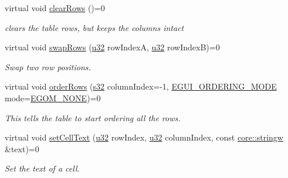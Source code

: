 \begin{DoxyCompactItemize}
virtual void \hyperlink{classirr_1_1gui_1_1IGUITable_a492adc813893d062f66c35dafa653fad}{clear\+Rows} ()=0
\begin{DoxyCompactList}\small\item\em clears the table rows, but keeps the columns intact \end{DoxyCompactList}\item 
\mbox{\label{classirr_1_1gui_1_1IGUITable_a9b54731c433912b00b3393c98a53ca68}} 
virtual void \hyperlink{classirr_1_1gui_1_1IGUITable_a9b54731c433912b00b3393c98a53ca68}{swap\+Rows} (\hyperlink{namespaceirr_a0416a53257075833e7002efd0a18e804}{u32} row\+IndexA, \hyperlink{namespaceirr_a0416a53257075833e7002efd0a18e804}{u32} row\+IndexB)=0
\begin{DoxyCompactList}\small\item\em Swap two row positions. \end{DoxyCompactList}\item 
virtual void \hyperlink{classirr_1_1gui_1_1IGUITable_a22ec8c1ee8e6a191b8bdcd741b0144f2}{order\+Rows} (\hyperlink{namespaceirr_ac66849b7a6ed16e30ebede579f9b47c6}{s32} column\+Index=-\/1, \hyperlink{namespaceirr_1_1gui_a577bf3aa30c2e3bde9aa3eaa2e4f16d3}{E\+G\+U\+I\+\_\+\+O\+R\+D\+E\+R\+I\+N\+G\+\_\+\+M\+O\+DE} mode=\hyperlink{namespaceirr_1_1gui_a577bf3aa30c2e3bde9aa3eaa2e4f16d3a4663b40ac164a811834112141af86961}{E\+G\+O\+M\+\_\+\+N\+O\+NE})=0
\begin{DoxyCompactList}\small\item\em This tells the table to start ordering all the rows. \end{DoxyCompactList}\item 
\mbox{\label{classirr_1_1gui_1_1IGUITable_a4e2445949ad689a3afca73d693d01e9c}} 
virtual void \hyperlink{classirr_1_1gui_1_1IGUITable_a4e2445949ad689a3afca73d693d01e9c}{set\+Cell\+Text} (\hyperlink{namespaceirr_a0416a53257075833e7002efd0a18e804}{u32} row\+Index, \hyperlink{namespaceirr_a0416a53257075833e7002efd0a18e804}{u32} column\+Index, const \hyperlink{namespaceirr_1_1core_aef83fafbb1b36fcce44c07c9be23a7f2}{core\+::stringw} \&text)=0
\begin{DoxyCompactList}\small\item\em Set the text of a cell. \end{DoxyCompactList}\item 
\mbox{\label{classirr_1_1gui_1_1IGUITable_ab23ea414e2a01dd8ed8b3ab659318653}} 

\end{DoxyCompactItemize}
